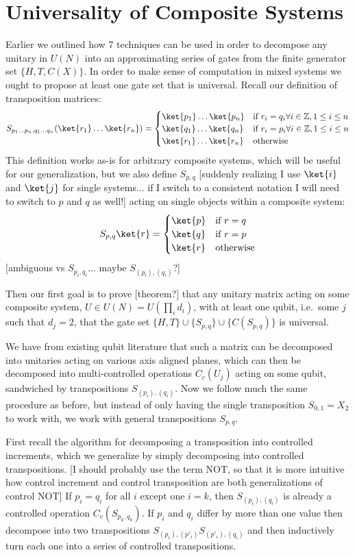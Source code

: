 \section{Universality of Composite Systems}
Earlier we outlined how 7 techniques can be used in order to decompose any unitary in $U(N)$ into an approximating series of gates from the finite generator set $\{H, T, C(X)\}$. In order to make sense of computation in mixed systems we ought to propose at least one gate set that is universal. Recall our definition of transposition matrices:
\[S_{p_1\dots p_n, q_1\dots q_n}(\ket{r_1}\dots\ket{r_n}) = \begin{cases}
	\ket{p_1}\dots\ket{p_n} & \text{if\ } r_i = q_i \forall i \in \mathbb{Z}, 1 \leq i \leq n \\
	\ket{q_1}\dots\ket{q_n} & \text{if\ } r_i = p_i \forall i \in \mathbb{Z}, 1 \leq i \leq n \\
	\ket{r_1}\dots\ket{r_n} & \text{otherwise}
\end{cases}
\]
This definition works as-is for arbitrary composite systems, which will be useful for our generalization, but we also define $S_{p,q}$ [suddenly realizing I use $\ket{i}$ and $\ket{j}$ for single systems... if I switch to a consistent notation I will need to switch to $p$ and $q$ as well!] acting on single objects within a composite system:
\[S_{p, q}\ket{r} =
\begin{cases}
	\ket{p} & \text{if\ } r = q \\
	\ket{q} & \text{if\ } r = p \\
	\ket{r} & \text{otherwise}
\end{cases}
\]
[ambiguous vs $S_{p_i, q_i}$... maybe $S_{(p_i),(q_i)}$?]

Then our first goal is to prove [theorem?] that any unitary matrix acting on some composite system, $U \in U(N) = U(\prod_i d_i)$, with at least one qubit, i.e.\ some $j$ such that $d_j = 2$, that the gate set $\{H, T\} \cup \{S_{p,q}\} \cup \{C(S_{p,q})\}$ is universal.

We have from existing qubit literature that such a matrix can be decomposed into unitaries acting on various axis aligned planes, which can then be decomposed into multi-controlled operations $C_c(U_j)$ acting on some qubit, sandwiched by transpositions $S_{(p_i),(q_i)}$. Now we follow much the same procedure as before, but instead of only having the single transposition $S_{0, 1} = X_2$ to work with, we work with general transpositions $S_{p, q}$.

First recall the algorithm for decomposing a transposition into controlled increments, which we generalize by simply decomposing into controlled transpositions. [I should probably use the term NOT, so that it is more intuitive how control increment and control transposition are both generalizations of control NOT] If $p_i = q_i$ for all $i$ except one $i = k$, then $S_{(p_i), (q_i)}$ is already a controlled operation $C_c(S_{p_k,q_k})$. If $p_i$ and $q_i$ differ by more than one value then decompose into two transpositions $S_{(p_i), (p'_i)}S_{(p'_i), (q_i)}$ and then inductively turn each one into a series of controlled transpositions.

